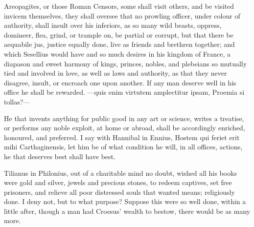{Areopagites, or those Roman Censors, some shall visit others, and
be visited invicem themselves,  they shall oversee that no
prowling officer, under colour of authority, shall insult over his
inferiors, as so many wild beasts, oppress, domineer, flea, grind, or
trample on, be partial or corrupt, but that there be aequabile jus,
justice equally done, live as friends and brethren together; and which
Sesellius would have and so much desires in his kingdom of France,
a diapason and sweet harmony of kings, princes, nobles, and plebeians
so mutually tied and involved in love, as well as laws and authority,
as that they never disagree, insult, or encroach one upon another. If
any man deserve well in his office he shall be rewarded.
---quis enim virtutem amplectitur ipsam,
Proemia si tollas?---

He that invents anything for public good in any art or science, writes
a treatise, or performs any noble exploit, at home or abroad,
 shall be accordingly enriched, honoured, and preferred. I
say with Hannibal in Ennius, Hostem qui feriet erit mihi
Carthaginensis, let him be of what condition he will, in all offices,
actions, he that deserves best shall have best.

Tilianus in Philonius, out of a charitable mind no doubt, wished all
his books were gold and silver, jewels and precious stones, to
redeem captives, set free prisoners, and relieve all poor distressed
souls that wanted means; religiously done. I deny not, but to what
purpose? Suppose this were so well done, within a little after, though
a man had Croesus' wealth to bestow, there would be as many more.

}
